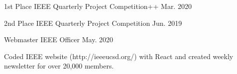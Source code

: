

\begin{cventries}

  \cventry
    {} %
    {1st Place IEEE Quarterly Project Competition++} %
    {Mar. 2020} %
    {} %
    {}
    \vspace{-30pt}


  \cventry
    {} %
    {2nd Place IEEE Quarterly Project Competition} %
    {Jun. 2019} %
    {} %
    {}
    \vspace{-30pt}


  \cventry
    {Webmaster} %
    {IEEE Officer} %
    {May. 2020} %
    {} %
     {
      \begin{cvitems} %
        \item Coded IEEE website (http://ieeeucsd.org/) with React and created weekly newsletter for over 20,000 members.
      \end{cvitems}
    }
    \vspace{-30pt}



\end{cventries}